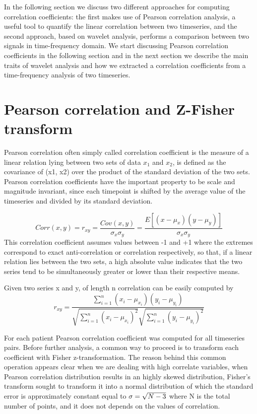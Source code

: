 \documentclass[11pt]{report}
\begin{document}
In the following section we discuss two different approaches for computing correlation coefficients: the first makes use of Pearson correlation analysis, a useful tool to quantify the linear correlation between two timeseries, and the second approach, based on wavelet analysis, performs a comparison between two signals in time-frequency domain.
We start discussing Pearson correlation coefficients in the following section and in the next section we describe the main traits of wavelet analysis and how we extracted a correlation coefficients from a time-frequency analysis of two timeseries.

\section{Pearson correlation and Z-Fisher transform}
Pearson correlation often simply called correlation coefficient is the measure of a linear relation lying between two sets of data $x_1$ and $x_2$, is defined as the covariance of (x1, x2) over the product of the standard deviation of the two sets.
Pearson correlation coefficients have the important property to be scale and magnitude invariant, since each timepoint is shifted by the average value of the timeseries and divided by its standard deviation.

\begin{equation}
Corr(x, y) = r_{xy}=  \frac{Cov\left( x, y\right)}{\sigma_x \sigma_y} = \frac{E\left[ \left( x - \mu_x \right) \left( y - \mu_y \right)\right]}{\sigma_{x} \sigma_{y}}
\end{equation}
This correlation coefficient assumes values between -1 and +1 where the extremes correspond to exact anti-correlation or correlation respectively, so that, if a linear relation lies between the two sets, a high absolute value indicates that the two series tend to be simultaneously greater or lower than their respective means. \cite{baldini2021}

Given two series x and y, of length n correlation can be easily computed by
\begin{equation}
r_{xy} = \frac{\sum_{i = 1}^n \left( x_i - \mu_{x_i}\right)\left( y_i - \mu_{y_i}\right)}{\sqrt{\sum_{i = 1}^n \left( x_i -\mu_{x_i}\right)^2}\sqrt{\sum_{i = 1}^n \left( y_i -\mu_{y_i}\right)^2}}
\end{equation}

For each patient Pearson correlation coefficient was computed for all timeseries pairs. Before further analysis, a common way to proceed is to transform each coefficient with Fisher z-transformation.\cite{spera-2019}
The reason behind this common operation appears clear when we are dealing with high correlate variables, when Pearson correlation distribution results in an highly skewed distribution, Fisher's transform sought to transform it into a normal distribution of which the standard error is approximately constant equal to $\sigma = \/\sqrt{N-3}$ where N is the total number of points, and it does not depends on the values of correlation.\cite{wicklin2017}
\end{document}
